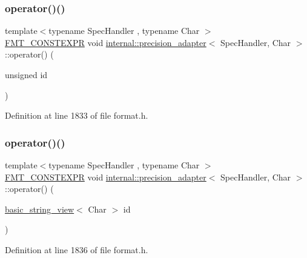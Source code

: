 \subsubsection{\texorpdfstring{operator()()}{operator()()}\hspace{0.1cm}{\footnotesize\ttfamily [2/3]}}
{\footnotesize\ttfamily template$<$typename Spec\+Handler , typename Char $>$ \\
\hyperlink{core_8h_a69201cb276383873487bf68b4ef8b4cd}{F\+M\+T\+\_\+\+C\+O\+N\+S\+T\+E\+X\+PR} void \hyperlink{structinternal_1_1precision__adapter}{internal\+::precision\+\_\+adapter}$<$ Spec\+Handler, Char $>$\+::operator() (\begin{DoxyParamCaption}\item[{unsigned}]{id }\end{DoxyParamCaption})\hspace{0.3cm}{\ttfamily [inline]}}



Definition at line 1833 of file format.\+h.

\mbox{\label{structinternal_1_1precision__adapter_a2c16675ac3d045776c3b3f4da1db5907}} 
\subsubsection{\texorpdfstring{operator()()}{operator()()}\hspace{0.1cm}{\footnotesize\ttfamily [3/3]}}
{\footnotesize\ttfamily template$<$typename Spec\+Handler , typename Char $>$ \\
\hyperlink{core_8h_a69201cb276383873487bf68b4ef8b4cd}{F\+M\+T\+\_\+\+C\+O\+N\+S\+T\+E\+X\+PR} void \hyperlink{structinternal_1_1precision__adapter}{internal\+::precision\+\_\+adapter}$<$ Spec\+Handler, Char $>$\+::operator() (\begin{DoxyParamCaption}\item[{\hyperlink{classbasic__string__view}{basic\+\_\+string\+\_\+view}$<$ Char $>$}]{id }\end{DoxyParamCaption})\hspace{0.3cm}{\ttfamily [inline]}}



Definition at line 1836 of file format.\+h.



